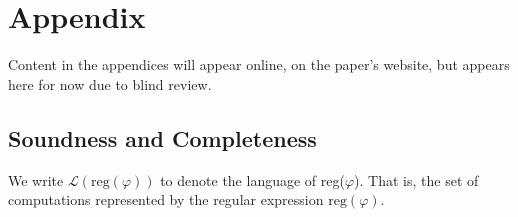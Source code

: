 \documentclass[runningheads]{llncs}
\renewcommand{\phi}{\varphi}
\begin{document}
\section*{Appendix} \label{Appendix}
\renewcommand{\thesection}{\Roman{section}}
Content in the appendices will appear online, on the paper's website, but appears here for now due to blind review.

 \subsection{Soundness and Completeness} \label{Appendix-SoundComplete}
 We write $\mathscr{L}(\text{reg}(\phi))$ to denote the language of reg($\phi$). That is, the set of computations represented by the regular expression $\text{reg}(\phi)$.
\end{document}
